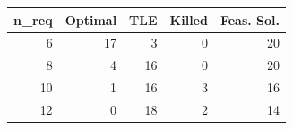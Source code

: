 
\begin{tabular}{rrrrr}
\toprule
n\_req & Optimal & TLE & Killed & Feas. Sol.\\
\midrule
6 & 17 & 3 & 0 & 20\\
8 & 4 & 16 & 0 & 20\\
10 & 1 & 16 & 3 & 16\\
12 & 0 & 18 & 2 & 14\\
\bottomrule
\end{tabular}
